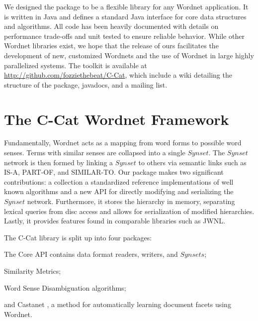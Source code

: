 \documentclass[a4paper,11pt]{article}
\begin{document}

We designed the package to be a flexible library for any Wordnet application.  It is written in Java and defines a standard Java interface for core data structures and algorithms.  All code has been heavily documented with details on performance trade-offs and unit tested to ensure reliable behavior.  While other Wordnet libraries exist, we hope that the release of ours facilitates the development of new, customized Wordnets and the use of Wordnet in large highly parallelized systems.   The toolkit is available at {\small \url{http://github.com/fozziethebeat/C-Cat}}, which include a wiki detailing the
structure of the package, javadocs, and a mailing list.

\section{The C-Cat Wordnet Framework}

Fundamentally, Wordnet acts as a mapping from word forms to possible word senses.  Terms with similar senses are collapsed into a single $Synset$.  The $Synset$ network is then formed by linking a $Synset$ to others via semantic links such as IS-A, PART-OF, and SIMILAR-TO. Our package makes two significant contributions: a collection a standardized reference implementations of well known algorithms and a new API for directly modifying and serializing the $Synset$ network.  Furthermore, it stores the hierarchy in memory, separating lexical queries from disc access and allows for serialization of modified hierarchies.  Lastly, it provides features found in comparable libraries such as JWNL.


The C-Cat library is split up into four packages:
\begin{enumerate}
{\small
\item The Core API contains data format readers, writers, and $Synsets$;
\item Similarity Metrics;
\item Word Sense Disambiguation algorithms;
\item and Castanet \cite{stoica07automatingcreation}, a method for automatically learning document
facets using Wordnet.
}
\end{enumerate}
\end{document}
